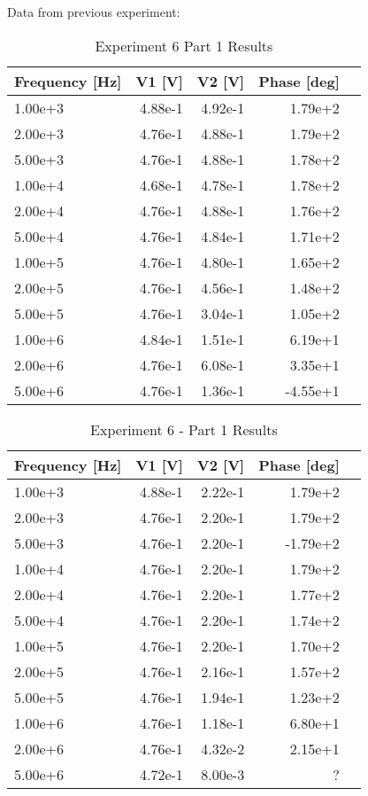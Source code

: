 \documentclass[12pt]{report}
\begin{document}
Data from previous experiment: \\
\begin{table}[!htp]\centering
\begin{tabular}{lrrrr}\toprule
Frequency [Hz] &V1 [V] &V2 [V] &Phase [deg] \\\midrule
1.00e+3 &4.88e-1 &4.92e-1 &1.79e+2 \\
2.00e+3 &4.76e-1 &4.88e-1 &1.79e+2 \\
5.00e+3 &4.76e-1 &4.88e-1 &1.78e+2 \\
1.00e+4 &4.68e-1 &4.78e-1 &1.78e+2 \\
2.00e+4 &4.76e-1 &4.88e-1 &1.76e+2 \\
5.00e+4 &4.76e-1 &4.84e-1 &1.71e+2 \\
1.00e+5 &4.76e-1 &4.80e-1 &1.65e+2 \\
2.00e+5 &4.76e-1 &4.56e-1 &1.48e+2 \\
5.00e+5 &4.76e-1 &3.04e-1 &1.05e+2 \\
1.00e+6 &4.84e-1 &1.51e-1 &6.19e+1 \\
2.00e+6 &4.76e-1 &6.08e-1 &3.35e+1 \\
5.00e+6 &4.76e-1 &1.36e-1 &-4.55e+1 \\
\bottomrule
\end{tabular}
\caption{Experiment 6 Part 1 Results}\label{tab: }
\end{table}

\begin{table}[!htp]\centering
\begin{tabular}{lrrrr}\toprule
Frequency [Hz] &V1 [V] &V2 [V] &Phase [deg] \\\midrule
1.00e+3 &4.88e-1 &2.22e-1 &1.79e+2 \\
2.00e+3 &4.76e-1 &2.20e-1 &1.79e+2 \\
5.00e+3 &4.76e-1 &2.20e-1 &-1.79e+2 \\
1.00e+4 &4.76e-1 &2.20e-1 &1.79e+2 \\
2.00e+4 &4.76e-1 &2.20e-1 &1.77e+2 \\
5.00e+4 &4.76e-1 &2.20e-1 &1.74e+2 \\
1.00e+5 &4.76e-1 &2.20e-1 &1.70e+2 \\
2.00e+5 &4.76e-1 &2.16e-1 &1.57e+2 \\
5.00e+5 &4.76e-1 &1.94e-1 &1.23e+2 \\
1.00e+6 &4.76e-1 &1.18e-1 &6.80e+1 \\
2.00e+6 &4.76e-1 &4.32e-2 &2.15e+1 \\
5.00e+6 &4.72e-1 &8.00e-3 &? \\
\bottomrule
\end{tabular}
\caption{Experiment 6 - Part 1 Results}\label{tab: }
\end{table}
\end{document}
